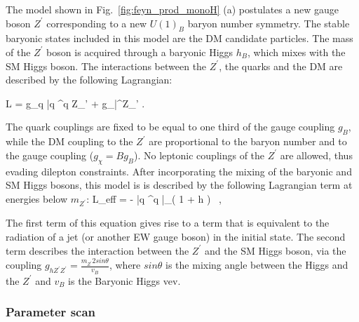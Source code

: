 The model shown in Fig.~\ref{fig:feyn_prod_monoH} (a)
postulates a new gauge boson $Z^\prime$ corresponding to a new $U(1)_B$ baryon 
number symmetry. The stable baryonic states included in this model are the DM candidate particles.
The mass of the $Z^\prime$ boson is acquired through a baryonic Higgs $h_B$, which mixes with the 
SM Higgs boson. The interactions between the $Z^\prime$, the quarks and the DM are described by 
the following Lagrangian:   

\be \label{ZprimeDM}
	L =  g_q  \bar q \gamma^\mu q  Z_\mu' +
%
	 g_\chi  \bar\chi \gamma^\mu \chi Z_\mu' .
\ee

The quark couplings \gq are fixed to be equal to one third of the gauge coupling $g_B$, 
while the DM coupling to the $Z^\prime$ are proportional to the baryon number and to the gauge coupling 
($g_{\chi} = B g_B$). No leptonic couplings of the $Z^\prime$ are allowed, thus evading dilepton constraints. 
After incorporating the mixing of the baryonic and SM Higgs bosons, this model is 
is described by the following Lagrangian term at energies below $m_{Z^\prime}$: 
 \be \label{U1Beft}
 L_{\rm eff} = -  \bar{q} \gamma^\mu q \bar\chi \gamma_\mu \chi \Big( 1 +  h \Big) \, ,
 \ee

The first term of this equation gives rise to a term that is equivalent to the 
radiation of a jet (or another EW gauge boson) in the initial state. 
The second term describes the interaction between the $Z^\prime$ and the SM Higgs boson,
via the coupling $g_{h Z^\prime Z^\prime} = \frac{m_{Z^\prime}2 sin\theta}{v_B}$, where
$sin\theta$ is the mixing angle between the Higgs and the $Z^\prime$ and $v_B$ is the
Baryonic Higgs vev. 


\subsubsection{Parameter scan} 

